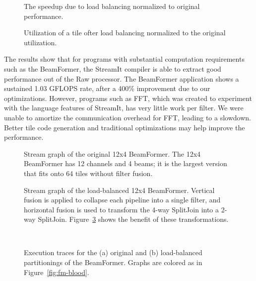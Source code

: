 \begin{figure}
\begin{minipage}{3.2in}
\centering
{}
\caption{The speedup due to load balancing normalized to original performance.
\protect\label{fig:opt-diagram}}
\end{minipage}
\hspace{0.1in}
\begin{minipage}{3.2in}
\centering
{}
\caption{Utilization of a tile ofter load balancing normalized to the original utilization.\protect\label{fig:utilization-diagram}}
\end{minipage}
\end{figure}

The results show that for programs with substantial computation
requirements such as the BeamFormer, the StreamIt compiler is able to
extract good performance out of the Raw processor.  The BeamFormer
application shows a sustained 1.03 GFLOPS rate, after a 400\%
improvement due to our optimizations.  However, programs such as FFT,
which was created to experiment with the language features of
StreamIt, has very little work per filter. We were unable to amortize
the communication overhead for FFT, leading to a slowdown.  Better
tile code generation and traditional optimizations may help improve
the performance.

\begin{figure}
\centering
{}
\caption{\protect\small Stream graph of the original 12x4 BeamFormer.  The 12x4 BeamFormer has 12 channels and 4 beams; it is the largest version that fits onto 64 tiles without filter fusion.  \protect\label{fig:beam-orig}}
\vspace{36pt}
\caption{\protect\small Stream graph of the load-balanced 12x4 BeamFormer.  Vertical fusion is applied to collapse each pipeline into a single filter, and horizontal fusion is used to transform the 4-way SplitJoin into a 2-way SplitJoin.
Figure~\ref{fig:beam-blood} shows the benefit of these
transformations. \protect\label{fig:beam-opt}}
\end{figure}

\begin{figure}
  \begin{center}  \\
    \hspace{0.3in}  \vspace{-6pt} \caption{Execution traces for the (a)
    original and (b) load-balanced partitionings of the BeamFormer.
    Graphs are colored as in
    Figure~\ref{fig:fm-blood}. \protect\label{fig:beam-blood}}
    \vspace{-6pt}
\end{center}
\end{figure}
